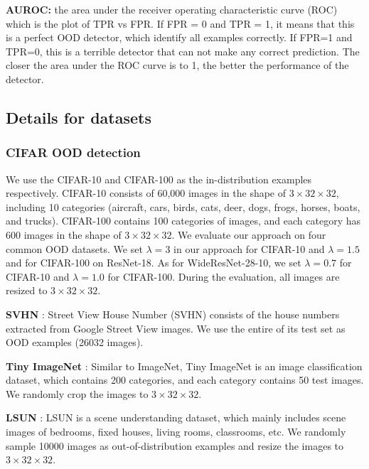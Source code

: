 \documentclass{article}
\begin{document}
\textbf{AUROC:} the area under the receiver operating characteristic curve (ROC) which is the plot of
TPR vs FPR. If FPR = 0 and TPR = 1, it means that this is a perfect OOD detector, which identify all examples correctly. If FPR=1 and TPR=0, this is a terrible detector that can not make any correct prediction. The closer the area under the ROC curve is to 1, the better the performance of the detector.

\subsection{Details for datasets}

\subsubsection{CIFAR OOD detection}

We use the CIFAR-10 and CIFAR-100 \cite{krizhevsky2009learningCIFAR} as the in-distribution examples respectively. CIFAR-10 consists of 60,000 images in the shape of $3 \times 32 \times 32$, including 10 categories (aircraft, cars, birds, cats, deer, dogs, frogs, horses, boats, and trucks). CIFAR-100 contains 100 categories of images, and each category has 600 images in the shape of $3 \times 32 \times 32$. We evaluate our approach on four common OOD datasets. We set $\lambda=3$ in our approach for CIFAR-10 and $\lambda=1.5$ and for CIFAR-100 on ResNet-18. As for WideResNet-28-10, we set $\lambda=0.7$ for CIFAR-10 and $\lambda=1.0$ for CIFAR-100. During the evaluation, all images are resized to $3 \times 32 \times 32$.

\textbf{SVHN} \cite{netzer2011readingSVHN}: Street View House Number (SVHN) consists of the house numbers extracted from Google Street View images. We use the entire of its test set as OOD examples (26032 images).



\textbf{Tiny ImageNet} \cite{chrabaszcz2017downsampledTiny}: Similar to ImageNet, Tiny ImageNet is an image classification dataset, which contains 200 categories, and each category contains 50 test images. We randomly crop the images to $3 \times 32 \times 32$.

\textbf{LSUN} \cite{yu2015lsun}: LSUN is a scene understanding dataset, which mainly includes scene images of bedrooms, fixed houses, living rooms, classrooms, etc. We randomly sample 10000 images as out-of-distribution examples and resize the images to $3 \times 32 \times 32$.
\end{document}
